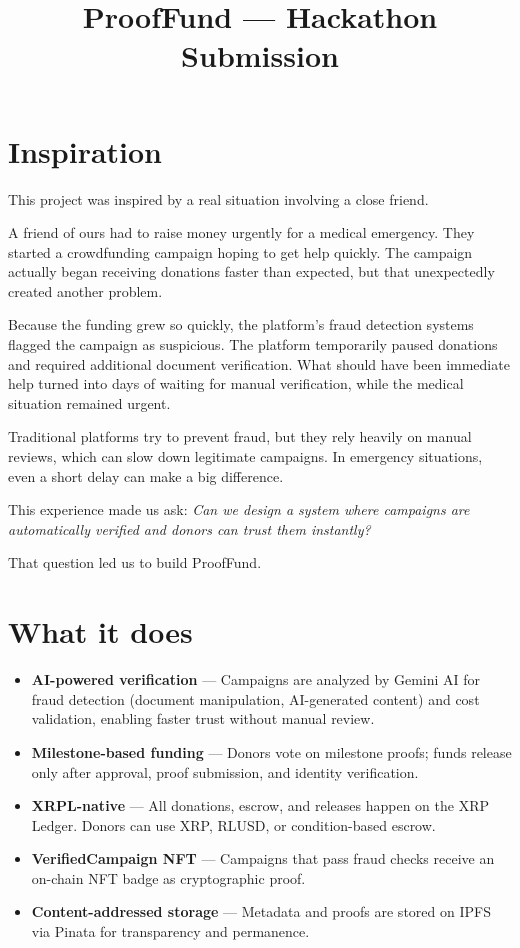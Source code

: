 \documentclass[11pt]{article}
\title{ProofFund — Hackathon Submission}
\author{}
\date{}
\begin{document}
\maketitle

\section{Inspiration}

This project was inspired by a real situation involving a close friend.

A friend of ours had to raise money urgently for a medical emergency. They started a crowdfunding campaign hoping to get help quickly. The campaign actually began receiving donations faster than expected, but that unexpectedly created another problem.

Because the funding grew so quickly, the platform's fraud detection systems flagged the campaign as suspicious. The platform temporarily paused donations and required additional document verification. What should have been immediate help turned into days of waiting for manual verification, while the medical situation remained urgent.

Traditional platforms try to prevent fraud, but they rely heavily on manual reviews, which can slow down legitimate campaigns. In emergency situations, even a short delay can make a big difference.

This experience made us ask: \textit{Can we design a system where campaigns are automatically verified and donors can trust them instantly?}

That question led us to build ProofFund.

\section{What it does}

\begin{itemize}[noitemsep]
\item \textbf{AI-powered verification} — Campaigns are analyzed by Gemini AI for fraud detection (document manipulation, AI-generated content) and cost validation, enabling faster trust without manual review.
\item \textbf{Milestone-based funding} — Donors vote on milestone proofs; funds release only after approval, proof submission, and identity verification.
\item \textbf{XRPL-native} — All donations, escrow, and releases happen on the XRP Ledger. Donors can use XRP, RLUSD, or condition-based escrow.
\item \textbf{VerifiedCampaign NFT} — Campaigns that pass fraud checks receive an on-chain NFT badge as cryptographic proof.
\item \textbf{Content-addressed storage} — Metadata and proofs are stored on IPFS via Pinata for transparency and permanence.
\end{itemize}
\end{document}
